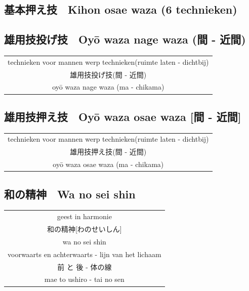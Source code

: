 \documentclass[12pt]{scrartcl}
\begin{document}
\begin{CJK*}{UTF8}{min}
\subsection{基本押え技　Kihon osae waza (6 technieken)}

\subsection{雄用技投げ技　Oy\={o} waza nage waza (間 - 近間)}
\begin{table}[H]
\begin{center}
\begin{tabular}{c}
technieken voor mannen werp technieken(ruimte laten - dichtbij)\\
雄用技投げ技(間 - 近間)\\
oy\={o} waza nage waza (ma - chikama)\\
\end{tabular}
\end{center}
\label{oyouwazanagewaza}
\end{table}

\subsection{雄用技押え技　Oy\={o} waza osae waza [間 - 近間]}
\begin{table}[H]
\begin{center}
\begin{tabular}{c}
technieken voor mannen werp technieken(ruimte laten - dichtbij)\\
雄用技押え技(間 - 近間)\\
oy\={o} waza osae waza (ma - chikama)\\
\end{tabular}
\end{center}
\label{oyouwazaosaewaza}
\end{table}

\subsection{和の精神　Wa no sei shin}
\begin{table}[H]
\begin{center}
\begin{tabular}{c}
geest in harmonie\\
和の精神[わのせいしん]\\
wa no sei shin\\
\hline
voorwaarts en achterwaarts - lijn van het lichaam\\
前 と 後 - 体の線\\
mae to ushiro - tai no sen
\end{tabular}
\end{center}
\label{wanoseishin}
\end{table}


\end{CJK*}
\end{document}
